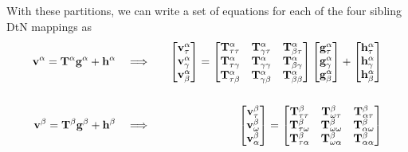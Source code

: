 With these partitions, we can write a set of equations for each of the four sibling DtN mappings as
\begin{equation}
\begin{aligned}
\mathbf v^{\alpha} = \mathbf T^{\alpha} \mathbf g^{\alpha} + \mathbf h^{\alpha} \quad & \Longrightarrow  & \quad 
    \begin{bmatrix}
    \mathbf v^{\alpha}_{\tau} \\
    \mathbf v^{\alpha}_{\gamma} \\
    \mathbf v^{\alpha}_{\beta} \\
    \end{bmatrix}
    =
    \begin{bmatrix}
    \mathbf T^{\alpha}_{\tau\tau}   &\mathbf T^{\alpha}_{\gamma\tau}   & \mathbf T^{\alpha}_{\beta\tau} \\
    \mathbf T^{\alpha}_{\tau\gamma} &\mathbf T^{\alpha}_{\gamma\gamma} & \mathbf T^{\alpha}_{\beta\gamma} \\
    \mathbf T^{\alpha}_{\tau\beta}  &\mathbf T^{\alpha}_{\gamma\beta}  & \mathbf T^{\alpha}_{\beta\beta} \\
    \end{bmatrix}
    \begin{bmatrix}
    \mathbf g^{\alpha}_{\tau} \\
    \mathbf g^{\alpha}_{\gamma} \\
    \mathbf g^{\alpha}_{\beta} \\
    \end{bmatrix} + 
    \begin{bmatrix}
    \mathbf h^{\alpha}_{\tau} \\
    \mathbf h^{\alpha}_{\gamma} \\
    \mathbf h^{\alpha}_{\beta} \\
    \end{bmatrix}\\
&& \\
\mathbf v^{\beta} = \mathbf T^{\beta} \mathbf g^{\beta} + \mathbf h^{\beta} \quad & \Longrightarrow  & \quad
    \begin{bmatrix}
        \mathbf v^{\beta}_{\tau} \\
        \mathbf v^{\beta}_{\omega} \\
        \mathbf v^{\beta}_{\alpha} \\
    \end{bmatrix}
    =
    \begin{bmatrix}
        \mathbf T^{\beta}_{\tau\tau}   & \mathbf T^{\beta}_{\omega\tau}   & \mathbf T^{\beta}_{\alpha\tau} \\
        \mathbf T^{\beta}_{\tau\omega} & \mathbf T^{\beta}_{\omega\omega} & \mathbf T^{\beta}_{\alpha\omega} \\
        \mathbf T^{\beta}_{\tau\alpha} & \mathbf T^{\beta}_{\omega\alpha} & \mathbf T^{\beta}_{\alpha\alpha} \\

\end{bmatrix}
\end{aligned}
\end{equation}
